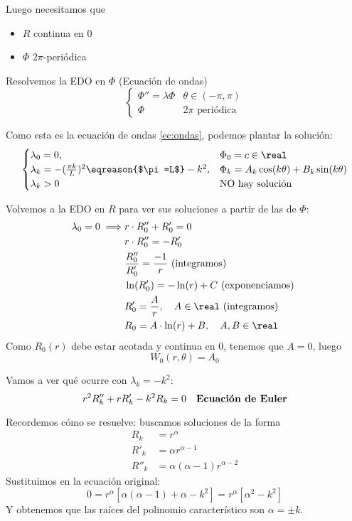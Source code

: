 		Luego necesitamos que
		\begin{itemize}
			\item $R$ continua en 0
			\item $\Phi$ $2\pi$-periódica
		\end{itemize}


		Resolvemos la EDO en $\Phi$ (Ecuación de ondas)
		\[
			\begin{cases}
				\Phi'' = \lambda \Phi & \theta \in (-\pi, \pi) \\
				\Phi & 2\pi \text{ periódica }
			\end{cases}
		\]

		Como esta es la ecuación de ondas \ref{ec:ondas}, podemos plantar la solución:
		\[
			\begin{cases}
				\lambda_0 = 0,& \Phi_0 = c \in \real\\
				\lambda_k = -(\frac{\pi k}{L})^2 \eqreason{$\pi=L$} -k^2, & \Phi_k = A_k \cos (k\theta) + B_k \sin (k\theta)\\
				\lambda_k > 0 & \text{NO hay solución}
			\end{cases}
		\]

		Volvemos a la EDO en $R$ para ver sus soluciones a partir de las de $\Phi$:
		\begin{align*}
			\lambda_0 = 0 \implies & r\cdot R_0'' + R'_0 = 0\\
			& r\cdot R_0'' = - R'_0\\
			& \frac{R''_0}{R'_0} = \frac{-1}{r} \text{ (integramos) }\\
			& \ln(R'_0) = - \ln(r) + C \text{ (exponenciamos) }\\
			& R'_0 = \frac{A}{r}, \quad A \in \real \text{ (integramos) }\\
			& R_0 = A \cdot \ln(r) + B, \quad A,B \in \real
		\end{align*}
		Como $R_0(r)$ debe estar acotada y continua en 0, tenemos que $A = 0$, luego $$W_{0}(r, \theta) = A_0$$

		Vamos a ver qué ocurre con $\lambda_k = -k^2$:
		\[r^2 R''_k + r R'_k - k^2 R_k = 0 \quad \text{\bf Ecuación de Euler}\]

		Recordemos cómo se resuelve: buscamos soluciones de la forma
		\begin{align*}
			R_k &= r^\alpha \\
			R'_k &= \alpha r^{\alpha - 1} \\
			R''_k &= \alpha(\alpha-1)r^{\alpha - 2}
		\end{align*}
		Sustituimos en la ecuación original:
		\[ 0 = r^\alpha [\alpha(\alpha -1)+ \alpha - k^2] = r^\alpha [\alpha^2 - k^2] \]
		Y obtenemos que las raíces del polinomio característico son $\alpha = ± k$.

